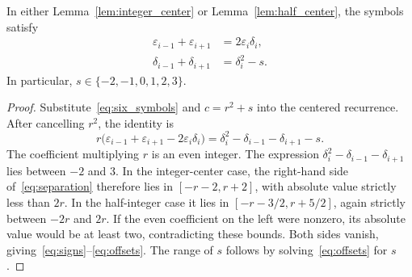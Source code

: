 \begin{proposition}
\label{prop:local_reduction}
In either Lemma~\ref{lem:integer_center} or
Lemma~\ref{lem:half_center}, the symbols satisfy
\begin{align}
 \varepsilon_{i-1}+\varepsilon_{i+1}
    &=2\varepsilon_i\delta_i, \label{eq:signs}\\
 \delta_{i-1}+\delta_{i+1}
    &=\delta_i^2-s. \label{eq:offsets}
\end{align}
In particular, \(s\in\{-2,-1,0,1,2,3\}\).
\end{proposition}
\begin{proof}
Substitute~\eqref{eq:six_symbols} and \(c=r^2+s\) into the centered
recurrence. After cancelling \(r^2\), the identity is
\begin{equation}
 r\bigl(\varepsilon_{i-1}+\varepsilon_{i+1}
          -2\varepsilon_i\delta_i\bigr)
 =\delta_i^2-\delta_{i-1}-\delta_{i+1}-s.
 \label{eq:separation}
\end{equation}
The coefficient multiplying \(r\) is an even integer. The expression
\(\delta_i^2-\delta_{i-1}-\delta_{i+1}\) lies between \(-2\) and 3.
In the integer-center case, the right-hand side of~\eqref{eq:separation}
therefore lies in \([-r-2,r+2]\), with absolute value strictly less than
\(2r\). In the half-integer case it lies in
\([-r-3/2,r+5/2]\), again strictly between \(-2r\) and \(2r\).
If the even coefficient on the left were nonzero, its absolute value
would be at least two, contradicting these bounds. Both sides vanish,
giving~\eqref{eq:signs}--\eqref{eq:offsets}. The range of \(s\) follows
by solving~\eqref{eq:offsets} for \(s\).
\end{proof}
